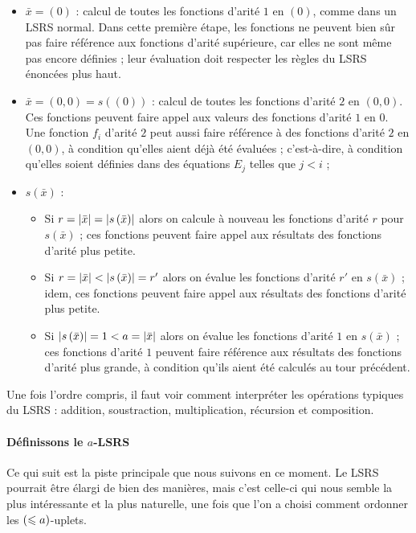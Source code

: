 	\begin{itemize}[itemsep=-1mm]
		\item 	$\bar{x} = (0)$ : calcul de toutes les fonctions d'arité $1$ en $(0)$, comme dans un LSRS normal. Dans cette première étape, les fonctions ne peuvent bien sûr pas faire référence aux fonctions d'arité supérieure, car elles ne sont même pas encore définies ; leur évaluation doit respecter les règles du LSRS énoncées plus haut. 
		\item 	$\bar{x} = (0,0) = s\left( \left( 0 \right)\right)$ : calcul de toutes les fonctions d'arité $2$ en $(0,0)$. Ces fonctions peuvent faire appel aux valeurs des fonctions d'arité $1$ en $0$. Une fonction $f_i$ d'arité $2$ peut aussi faire référence à des fonctions d'arité $2$ en $(0,0)$, à condition qu'elles aient déjà été évaluées ; c'est-à-dire, à condition qu'elles soient définies dans des équations $E_j$ telles que $j<i$ ;
		\item  	$s\left(\bar{x}\right)$ :
			\begin{itemize}[itemsep=-1mm]
				\item 	Si $r = \left|\bar{x}\right| = \left|s\left(\bar{x}\right)\right|$ alors on calcule à nouveau les fonctions d'arité $r$ pour $s\left(\bar{x}\right)$ ; ces fonctions peuvent faire appel aux résultats des fonctions d'arité plus petite. 
				\item 	Si $r = \left|\bar{x}\right| < \left|s\left(\bar{x}\right)\right| = r'$ alors on évalue les fonctions d'arité $r'$ en $s\left(\bar{x}\right)$ ; idem, ces fonctions peuvent faire appel aux résultats des fonctions d'arité plus petite.
				\item 	Si $\left|s\left(\bar{x}\right)\right| = 1 < a = \left|\bar{x}\right|$ alors on évalue les fonctions d'arité $1$ en $s\left(\bar{x}\right)$ ; ces fonctions d'arité $1$ peuvent faire référence aux résultats des fonctions d'arité plus grande, à condition qu'ils aient été calculés au tour précédent. 
			\end{itemize}
	\end{itemize}
	
	Une fois l'ordre compris, il faut voir comment interpréter les opérations typiques du LSRS : addition, soustraction, multiplication, récursion et composition.


		\paragraph{Définissons le $a$-LSRS}
		
		Ce qui suit est la piste principale que nous suivons en ce moment. Le LSRS pourrait être élargi de bien des manières, mais c'est celle-ci qui nous semble la plus intéressante et la plus naturelle, une fois que l'on a choisi comment ordonner les $\left( \leqslant a \right)$-uplets.
		
